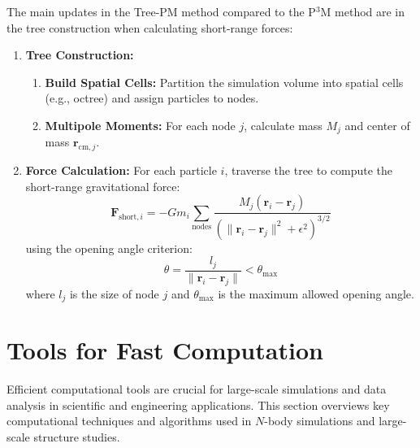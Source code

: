 The main updates in the Tree-PM method compared to the P$^3$M method are in the tree construction when calculating short-range forces:
\begin{enumerate}
    \item \textbf{Tree Construction:}
    \begin{enumerate}[label={(\alph*)}]
        \item \textbf{Build Spatial Cells:}
        Partition the simulation volume into spatial cells (e.g., octree) and assign particles to nodes.
        \item \textbf{Multipole Moments:}
        For each node $j$, calculate mass $M_j$ and center of mass $\mathbf{r}_{\text{cm},j}$.
    \end{enumerate}
    \item \textbf{Force Calculation:}
    For each particle $i$, traverse the tree to compute the short-range gravitational force:
        \[
        \mathbf{F}_{\text{short},i} = -G m_i \sum_{\text{nodes}} \frac{M_j (\mathbf{r}_i - \mathbf{r}_j)}{(\|\mathbf{r}_i - \mathbf{r}_j\|^2 + \epsilon^2)^{3/2}}
        \]
        using the opening angle criterion:
        \[
        \theta = \frac{l_j}{\|\mathbf{r}_i - \mathbf{r}_j\|} < \theta_{\text{max}}
        \]
        where $l_j$ is the size of node $j$ and $\theta_{\text{max}}$ is the maximum allowed opening angle.
\end{enumerate}

\section{Tools for Fast Computation}
Efficient computational tools are crucial for large-scale simulations and data analysis in scientific and engineering applications. This section overviews key computational techniques and algorithms used in $N$-body simulations and large-scale structure studies.

